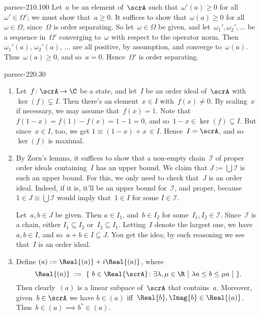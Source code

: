 \documentclass[b5page]{book}
\begin{document}
\begin{solution}{parsec-210.100}
Let~$a$ be an element of~$\scrA$
such that~$\omega'(a)\geq 0$
for all~$\omega'\in \Omega'$;
we must show that~$a\geq 0$.
    It suffices to show that~$\omega(a)\geq 0$
    for all~$\omega\in \Omega$,
    since~$\Omega$ is order separating.
    So let~$\omega\in \Omega$ be given,
    and let~$\omega_1',\omega_2',\dotsc$
    be a sequence in~$\Omega'$ converging to~$\omega$
    with respect to the operator norm.
    Then $\omega_1'(a),\,\omega_2'(a),\,\dotsc$
    are all positive, by assumption, and converge
    to~$\omega(a)$.  Thus~$\omega(a)\geq 0$, and so~$a=0$.
    Hence~$\Omega'$ is order separating.
\end{solution}
\begin{solution}{parsec-220.30}
\begin{enumerate}
\item
Let~$f\colon \scrA\to\C$ be a state,
and let~$I$ be an order ideal of~$\scrA$
with~$\ker(f)\subsetneq I$.
Then there's an element~$x\in I$ with~$f(x)\neq 0$.
By scaling~$x$ if necessary,  we may assume that~$f(x)=1$.
Note that~$f(1-x)=f(1)-f(x)=1-1=0$,
and so~$1-x\in\ker(f)\subseteq I$.
But since~$x\in I$, too, we get $1\equiv(1-x)+x\,\in I$.
Hence~$I=\scrA$, and so~$\ker(f)$ is maximal.
\item
By Zorn's lemma,
it suffices to show that a non-empty
chain~$\mathcal{I}$ of proper order ideals
containing~$I$ has an upper bound.
We claim that $J:=\bigcup\mathcal{I}$
is such an upper bound.
For this, we only need to check that~$J$
is an order ideal.  Indeed,
if it is, it'll be an upper bound for~$\mathcal{I}$,
and proper, because~$1\in J\equiv\bigcup \mathcal{I}$
would imply that~$1\in I$
for some $I \in\mathcal{I}$.

Let~$a,b\in J$
be given.
Then $a\in I_1$, and~$b\in I_2$ for some~$I_1,I_2\in\mathcal{I}$.
Since~$\mathcal{I}$ is a chain,
either $I_1\subseteq I_2$ or~$I_2\subseteq I_1$.
Letting~$I$ denote the largest one,
we have~$a,b\in I$, and so~$a+b\in I\subseteq J$.
You get the idea;
by such reasoning we see that~$I$
is an order ideal.

\item
Define $(a):=\Real{(a)}+i\Real{(a)}$,
where
$$\Real{(a)}\ :=\ \{\ b\in \Real{\scrA}\colon \exists\lambda,\mu\in\R\ 
[ \ \lambda a \leq b \leq \mu a\ ]\ \}.$$
Then clearly~$(a)$ is a linear subpace of~$\scrA$
that contains~$a$.
Moreover,
given~$b\in\scrA$
we have $b\in(a)$
iff~$\Real{b},\Imag{b}\in \Real{(a)}$.
Thus~$b\in(a)\implies b^*\in (a)$.


\end{enumerate}
\end{solution}
\end{document}
